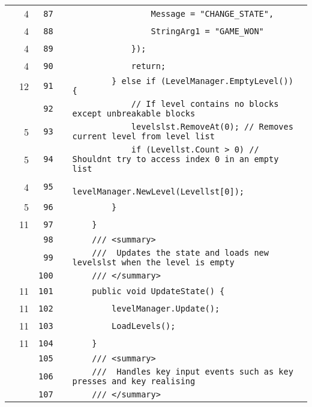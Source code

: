 \documentclass[a4paper,landscape,10pt]{article}
\begin{document}
\begin{longtable}[l]{lrrll}
\cellcolor{green} & 4 & \verb~87~ & & \verb~                Message = "CHANGE_STATE",~\\
\cellcolor{green} & 4 & \verb~88~ & & \verb~                StringArg1 = "GAME_WON"~\\
\cellcolor{green} & 4 & \verb~89~ & & \verb~            });~\\
\cellcolor{green} & 4 & \verb~90~ & & \verb~            return;~\\
\cellcolor{green} & 12 & \verb~91~ & & \verb~        } else if (LevelManager.EmptyLevel()) {~\\
\cellcolor{gray} &  & \verb~92~ & & \verb~            // If level contains no blocks except unbreakable blocks~\\
\cellcolor{green} & 5 & \verb~93~ & & \verb~            levelslst.RemoveAt(0); // Removes current level from level list~\\
\cellcolor{green} & 5 & \verb~94~ & & \verb~            if (Levellst.Count > 0) // Shouldnt try to access index 0 in an empty list~\\
\cellcolor{green} & 4 & \verb~95~ & & \verb~                levelManager.NewLevel(Levellst[0]);~\\
\cellcolor{green} & 5 & \verb~96~ & & \verb~        }~\\
\cellcolor{green} & 11 & \verb~97~ & & \verb~    }~\\
\cellcolor{gray} &  & \verb~98~ & & \verb~    /// <summary>~\\
\cellcolor{gray} &  & \verb~99~ & & \verb~    ///  Updates the state and loads new levelslst when the level is empty~\\
\cellcolor{gray} &  & \verb~100~ & & \verb~    /// </summary>~\\
\cellcolor{green} & 11 & \verb~101~ & & \verb~    public void UpdateState() {~\\
\cellcolor{green} & 11 & \verb~102~ & & \verb~        levelManager.Update();~\\
\cellcolor{green} & 11 & \verb~103~ & & \verb~        LoadLevels();~\\
\cellcolor{green} & 11 & \verb~104~ & & \verb~    }~\\
\cellcolor{gray} &  & \verb~105~ & & \verb~    /// <summary>~\\
\cellcolor{gray} &  & \verb~106~ & & \verb~    ///  Handles key input events such as key presses and key realising~\\
\cellcolor{gray} &  & \verb~107~ & & \verb~    /// </summary>~\\

\end{longtable}
\end{document}
